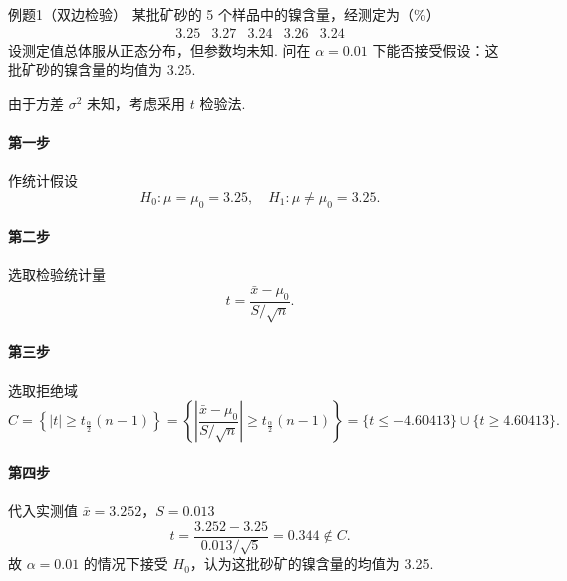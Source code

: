 \begin{question}{例题1（双边检验）}
    某批矿砂的 5 个样品中的镍含量，经测定为（\%）
    $$
        \begin{array}{ccccc}
            3.25 & 3.27 & 3.24 & 3.26 & 3.24
        \end{array}
    $$
    设测定值总体服从正态分布，但参数均未知. 问在 $\alpha=0.01$ 下能否接受假设：这批矿砂的镍含量的均值为 3.25.
\end{question}
\begin{solution}
    由于方差 $\sigma^2$ 未知，考虑采用 $t$ 检验法.
    \paragraph{第一步} 作统计假设
    $$
        H_0: \mu=\mu_0=3.25, \quad H_1: \mu \neq \mu_0=3.25.
    $$
    \paragraph{第二步} 选取检验统计量
    $$
        t = \frac{\bar{x}-\mu_0}{S/\sqrt{n}} .
    $$
    \paragraph{第三步} 选取拒绝域
    $$
        C = \left\{|t| \geqslant t_{\frac{\alpha}{2}}(n-1)\right\}
        = \left\{\left|\frac{\bar{x}-\mu_0}{S/\sqrt{n}}\right| \geqslant t_{\frac{\alpha}{2}}(n-1)\right\}
        = \{t \leqslant -4.60413\} \cup \{t \geqslant 4.60413\}.
    $$
    \paragraph{第四步} 代入实测值 $\bar{x}=3.252$，$S=0.013$
    $$
        t = \frac{3.252-3.25}{0.013/\sqrt{5}} = 0.344 \notin C.
    $$
    故 $\alpha = 0.01$ 的情况下接受 $H_0$，认为这批砂矿的镍含量的均值为 3.25.
\end{solution}




